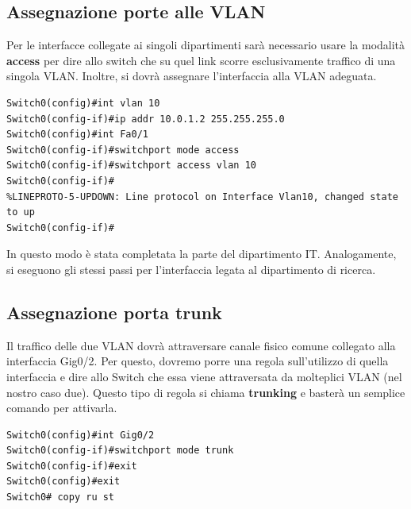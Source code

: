 \documentclass[a4paper,12pt]{report}
\begin{document}
\subsection{Assegnazione porte alle VLAN}
Per le interfacce collegate ai singoli dipartimenti sarà necessario usare la modalità \textbf{access} per dire allo switch che su quel link scorre esclusivamente traffico di una singola VLAN.
%
Inoltre, si dovrà assegnare l'interfaccia alla VLAN adeguata.
\begin{verbatim}
Switch0(config)#int vlan 10
Switch0(config-if)#ip addr 10.0.1.2 255.255.255.0
Switch0(config)#int Fa0/1
Switch0(config-if)#switchport mode access
Switch0(config-if)#switchport access vlan 10
Switch0(config-if)#
%LINEPROTO-5-UPDOWN: Line protocol on Interface Vlan10, changed state to up
Switch0(config-if)#
\end{verbatim} 
In questo modo è stata completata la parte del dipartimento IT.
%
Analogamente, si eseguono gli stessi passi per l'interfaccia legata al dipartimento di ricerca.
\subsection{Assegnazione porta trunk}
Il traffico delle due VLAN dovrà attraversare canale fisico comune collegato alla interfaccia Gig0/2.
%
Per questo, dovremo porre una regola sull'utilizzo di quella interfaccia e dire allo Switch che essa viene attraversata da molteplici VLAN (nel nostro caso due).
%
Questo tipo di regola si chiama \textbf{trunking} e basterà un semplice comando per attivarla.
\begin{verbatim}
Switch0(config)#int Gig0/2
Switch0(config-if)#switchport mode trunk
Switch0(config-if)#exit
Switch0(config)#exit
Switch0# copy ru st
\end{verbatim}
\end{document}
